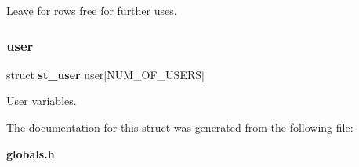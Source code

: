 Leave for rows free for further uses. \mbox{\label{structst__eeprom_a59282a1a28a7fc333cd680c9a8988b93}} 
\subsubsection{user}
{\footnotesize\ttfamily struct \textbf{ st\+\_\+user} user[N\+U\+M\+\_\+\+O\+F\+\_\+\+U\+S\+E\+RS]}

User variables. 

The documentation for this struct was generated from the following file\+:\begin{DoxyCompactItemize}
\item 
\textbf{ globals.\+h}\end{DoxyCompactItemize}
